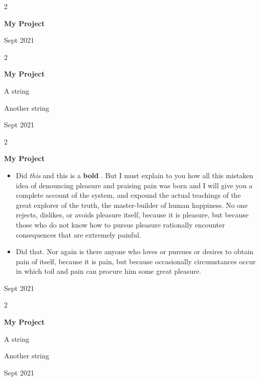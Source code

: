 \documentclass[10pt, letterpaper]{article}
\newenvironment{summary}{
    \begin{description}[
        topsep=0.10 cm,
        parsep=0.10 cm,
        partopsep=0pt,
        itemsep=0pt,
        leftmargin=0.4 cm + 10pt
    ]
}{
    \end{description}
} %
\newenvironment{highlights}{
    \begin{itemize}[
        topsep=0.10 cm,
        parsep=0.10 cm,
        partopsep=0pt,
        itemsep=0pt,
        leftmargin=0.4 cm + 10pt
    ]
}{
    \end{itemize}
} %
\newenvironment{twocolentry}[2][]{
    \onecolentry
    \def\secondColumn{#2}
    \setcolumnwidth{\fill, 4.5 cm}
    \begin{paracol}{2}
}{
    \switchcolumn \raggedleft \secondColumn
    \end{paracol}
    \endonecolentry
} %
\let\hrefWithoutArrow\href
\renewcommand{\href}[2]{\hrefWithoutArrow{#1}{\ifthenelse{\equal{#2}{}}{ }{#2 }\raisebox{.15ex}{\footnotesize \faExternalLink*}}}
\begin{document}
        \vspace{0.2 cm}

        \begin{twocolentry}{
            Sept 2021
        }
            \textbf{My Project}
        \end{twocolentry}


        \vspace{0.2 cm}

        \begin{twocolentry}{
            Sept 2021
        }
            \textbf{My Project}
            \begin{summary}
                \item A string
                \item Another string
            \end{summary}
        \end{twocolentry}


        \vspace{0.2 cm}

        \begin{twocolentry}{
            Sept 2021
        }
            \textbf{My Project}
            \begin{highlights}
                \item Did \textit{this} and this is a \textbf{bold} \href{https://example.com}{link}. But I must explain to you how all this mistaken idea of denouncing pleasure and praising pain was born and I will give you a complete account of the system, and expound the actual teachings of the great explorer of the truth, the master-builder of human happiness. No one rejects, dislikes, or avoids pleasure itself, because it is pleasure, but because those who do not know how to pursue pleasure rationally encounter consequences that are extremely painful.
                \item Did that. Nor again is there anyone who loves or pursues or desires to obtain pain of itself, because it is pain, but because occasionally circumstances occur in which toil and pain can procure him some great pleasure.
            \end{highlights}
        \end{twocolentry}


        \vspace{0.2 cm}

        \begin{twocolentry}{
            Sept 2021
        }
            \textbf{My Project}
            \begin{summary}
                \item A string
                \item Another string
            \end{summary}
        \end{twocolentry}
\end{document}
